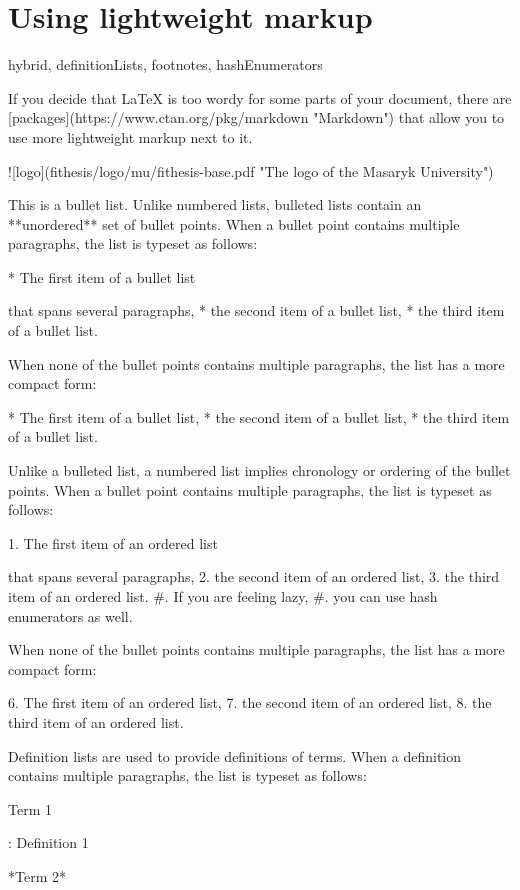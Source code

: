 \documentclass[
  digital, %
  table,   %
  lof,     %
  lot,     %
]{fithesis3}
\begin{document}
\chapter{Using lightweight markup}
\shorthandoff{-}
\begin{markdown*}{%
  hybrid,
  definitionLists,
  footnotes,
  hashEnumerators}

If you decide that \LaTeX{} is too wordy for some parts of your
document, there are [packages](https://www.ctan.org/pkg/markdown
"Markdown") that allow you to use more lightweight markup next
to it.

 ![logo](fithesis/logo/mu/fithesis-base.pdf "The logo of the
  Masaryk University")

This is a bullet list. Unlike numbered lists, bulleted lists
contain an **unordered** set of bullet points. When a bullet point
contains multiple paragraphs, the list is typeset as follows:

  * The first item of a bullet list

    that spans several paragraphs,
  * the second item of a bullet list,
  * the third item of a bullet list.

When none of the bullet points contains multiple paragraphs, the
list has a more compact form:

  * The first item of a bullet list,
  * the second item of a bullet list,
  * the third item of a bullet list.

Unlike a bulleted list, a numbered list implies chronology or
ordering of the bullet points. When a bullet point
contains multiple paragraphs, the list is typeset as follows:

  1. The first item of an ordered list

     that spans several paragraphs,
  2. the second item of an ordered list,
  3. the third item of an ordered list.
  #. If you are feeling lazy,
  #. you can use hash enumerators as well.

When none of the bullet points contains multiple paragraphs, the
list has a more compact form:

  6. The first item of an ordered list,
  7. the second item of an ordered list,
  8. the third item of an ordered list.

Definition lists are used to provide definitions of terms. When
a definition contains multiple paragraphs, the list is typeset
as follows:

Term 1

:   Definition 1

*Term 2*


\end{markdown*}
\end{document}
